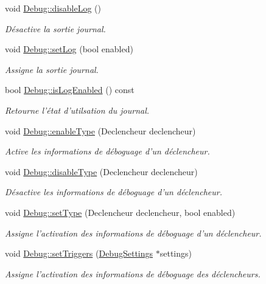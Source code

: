 \begin{DoxyCompactItemize}
void \hyperlink{group__inf2990_ga05742456a67e8e3104a3a6d0134c58ed}{Debug\-::disable\-Log} ()
\begin{DoxyCompactList}\small\item\em Désactive la sortie journal. \end{DoxyCompactList}\item 
void \hyperlink{group__inf2990_gafa37fad6a0a050a913eb0e482f1b0282}{Debug\-::set\-Log} (bool enabled)
\begin{DoxyCompactList}\small\item\em Assigne la sortie journal. \end{DoxyCompactList}\item 
bool \hyperlink{group__inf2990_gae22799c006444ad7f48e7de490b41ef0}{Debug\-::is\-Log\-Enabled} () const 
\begin{DoxyCompactList}\small\item\em Retourne l'état d'utilsation du journal. \end{DoxyCompactList}\item 
void \hyperlink{group__inf2990_ga55375c6c14be967ed7f25eed578a6265}{Debug\-::enable\-Type} (Declencheur declencheur)
\begin{DoxyCompactList}\small\item\em Active les informations de déboguage d'un déclencheur. \end{DoxyCompactList}\item 
void \hyperlink{group__inf2990_gaefa863abf2c2b3c6c741b88b3f78e8b3}{Debug\-::disable\-Type} (Declencheur declencheur)
\begin{DoxyCompactList}\small\item\em Désactive les informations de déboguage d'un déclencheur. \end{DoxyCompactList}\item 
void \hyperlink{group__inf2990_gaf6b5623dc8f2fdc90abb3648499f3415}{Debug\-::set\-Type} (Declencheur declencheur, bool enabled)
\begin{DoxyCompactList}\small\item\em Assigne l'activation des informations de déboguage d'un déclencheur. \end{DoxyCompactList}\item 
void \hyperlink{group__inf2990_gac502f42b3b17b681eaf0652836221177}{Debug\-::set\-Triggers} (\hyperlink{struct_debug_settings}{Debug\-Settings} $\ast$settings)
\begin{DoxyCompactList}\small\item\em Assigne l'activation des informations de déboguage des déclencheurs. \end{DoxyCompactList}\item 

\end{DoxyCompactItemize}
